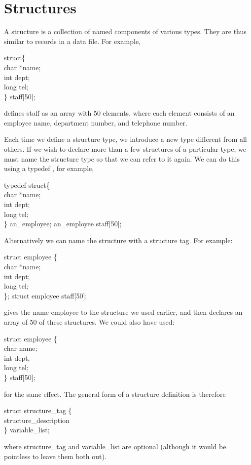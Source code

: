 
\section{Structures}
     A {\kc structure\/}  is a  collection of  named components of
various types. They are thus  similar to  records in  a data
file.  For example,
\begin{code}
struct\{  \+\\
 char *name; \\
 int dept; \\
 long tel; \-\\
\} staff[50];
\end{code}
\noindent
 defines {\cd staff} as an array with 50 elements, where each element
consists of an employee name, department number, and telephone
number.

Each time we define a structure type, we introduce a new type
different from all others. If we wish to declare more than  a few
structures of a particular type, we must name the
structure type  so that  we can  refer to  it again.  We can do this
using a 
{\cd typedef}
, 
for example,
\begin{code}
typedef struct\{  \+\\
 char *name; \\
 int dept; \\
 long tel; \-\\
\} an\_employee; \addVspace
an\_employee staff[50];
\end{code}
\noindent
Alternatively we can name the structure with a 
{\kc structure tag}.
For example:
\begin{code}
struct employee \{  \+\\
 char *name; \\
 int dept; \\
 long tel; \-\\
\}; \addVspace
struct employee staff[50];
\end{code}
\noindent
 gives the name {\cd employee} to the structure we used earlier, and
then declares an array of 50 of these structures. We could also have
used:
\begin{code}
struct employee \{  \+\\
 char name; \\
 int dept, \\
 long tel; \-\\
\} staff[50];
\end{code}
\noindent
for the same effect. The general form of a structure definition is
therefore
\begin{code}
struct {\ms structure\_tag\/} \{  \\
\> {\ms structure\_description\/}  \\
\} {\ms variable\_list\/};
\end{code}
\noindent
 where {\ms structure\_tag\/} and {\ms variable\_list\/} are optional
(although it would be pointless to leave them both out).

